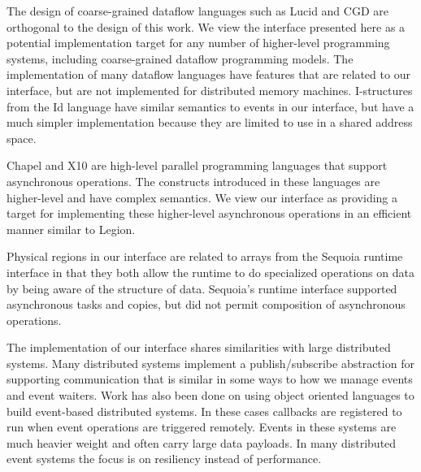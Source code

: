 The design of coarse-grained dataflow languages such as Lucid \cite{Lucid95}
and CGD \cite{CGD09} are orthogonal to the design of this work.  We view
the interface presented here as a potential implementation target for any
number of higher-level programming systems, including coarse-grained
dataflow programming models.  The implementation of many dataflow languages
have features that are related to our interface, but are not implemented
for distributed memory machines.  I-structures from the Id language \cite{Arvind89}
have similar semantics to events in our interface, but have a much simpler implementation
because they are limited to use in a shared address space.

Chapel\cite{Chamberlain:Chapel} and X10\cite{X1005} are high-level parallel
programming languages that support asynchronous operations.  The constructs
introduced in these languages are higher-level and have complex 
semantics.  We view our interface as providing a target
for implementing these higher-level asynchronous operations in an efficient
manner similar to Legion\cite{Legion12}.

Physical regions in our interface are related to
arrays from the Sequoia runtime interface\cite{Houston08} in that they
both allow the runtime to do specialized operations on data by being
aware of the structure of data.  Sequoia's runtime interface supported
asynchronous tasks and copies, but did not permit composition of
asynchronous operations.

The implementation of our interface shares similarities with large
distributed systems.  Many distributed systems implement a publish/subscribe
abstraction for supporting communication that is similar in some ways to how
we manage events and event waiters\cite{Aguilera99,Carzaniga01}.  Work has
also been done on using object oriented languages to build event-based
distributed systems\cite{Eugster01,Harrison97,Chang91}.  In these cases
callbacks are registered to run when event operations are triggered
remotely.  Events in these systems are much heavier weight
and often carry large data payloads.  In many distributed event systems
the focus is on resiliency instead of performance\cite{Ostrowski09}.
